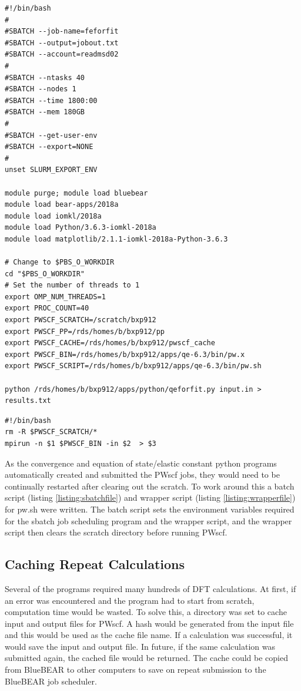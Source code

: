 \begin{lstlisting}[style=sPseudo,caption={Sbatch file},label={listing:sbatchfile}]
#!/bin/bash
#
#SBATCH --job-name=feforfit
#SBATCH --output=jobout.txt
#SBATCH --account=readmsd02
#
#SBATCH --ntasks 40
#SBATCH --nodes 1
#SBATCH --time 1800:00
#SBATCH --mem 180GB
#
#SBATCH --get-user-env
#SBATCH --export=NONE
#
unset SLURM_EXPORT_ENV

module purge; module load bluebear
module load bear-apps/2018a
module load iomkl/2018a
module load Python/3.6.3-iomkl-2018a
module load matplotlib/2.1.1-iomkl-2018a-Python-3.6.3

# Change to $PBS_O_WORKDIR
cd "$PBS_O_WORKDIR"
# Set the number of threads to 1
export OMP_NUM_THREADS=1
export PROC_COUNT=40
export PWSCF_SCRATCH=/scratch/bxp912
export PWSCF_PP=/rds/homes/b/bxp912/pp
export PWSCF_CACHE=/rds/homes/b/bxp912/pwscf_cache
export PWSCF_BIN=/rds/homes/b/bxp912/apps/qe-6.3/bin/pw.x
export PWSCF_SCRIPT=/rds/homes/b/bxp912/apps/qe-6.3/bin/pw.sh

python /rds/homes/b/bxp912/apps/python/qeforfit.py input.in > results.txt
\end{lstlisting}

\begin{lstlisting}[style=sPseudo,caption={Wrapper file},label={listing:wrapperfile}]
#!/bin/bash
rm -R $PWSCF_SCRATCH/*
mpirun -n $1 $PWSCF_BIN -in $2  > $3 
\end{lstlisting}

As the convergence and equation of state/elastic constant python programs automatically created and submitted the PWscf jobs, they would need to be continually restarted after clearing out the scratch.  To work around this a batch script (listing \ref{listing:sbatchfile}) and wrapper script (listing \ref{listing:wrapperfile}) for pw.sh were written.  The batch script sets the environment variables required for the sbatch job scheduling program and the wrapper script, and the wrapper script then clears the scratch directory before running PWscf.


\subsection{Caching Repeat Calculations}

Several of the programs required many hundreds of DFT calculations.  At first, if an error was encountered and the program had to start from scratch, computation time would be wasted.  To solve this, a directory was set to cache input and output files for PWscf.  A hash would be generated from the input file and this would be used as the cache file name.  If a calculation was successful, it would save the input and output file.  In future, if the same calculation was submitted again, the cached file would be returned.  The cache could be copied from BlueBEAR to other computers to save on repeat submission to the BlueBEAR job scheduler.


